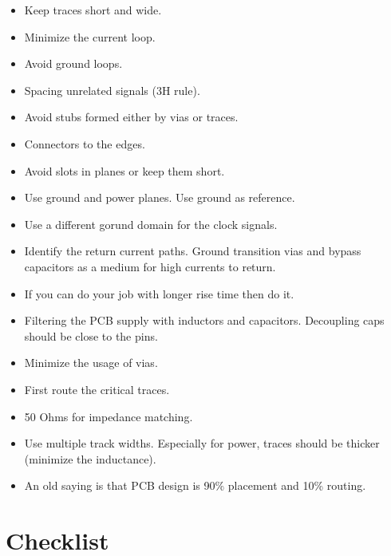 \documentclass[final]{cubedoc}
\begin{document}
	\begin{itemize}
		\item Keep traces short and wide. 
		\item Minimize the current loop.
		\item Avoid ground loops.
		\item Spacing unrelated signals (3H rule).
		\item Avoid stubs formed either by vias or traces.
		\item Connectors to the edges.
		\item Avoid slots in planes or keep them short.
		\item Use ground and power planes. Use ground as reference.
		\item Use a different gorund domain for the clock signals.
		\item Identify the return current paths. Ground transition vias and bypass capacitors as a medium for high currents to return.
		\item If you can do your job with longer rise time then do it.
		\item Filtering the PCB supply with inductors and capacitors. Decoupling caps should be close to the pins.
		\item Minimize the usage of vias.
		\item First route the critical traces.
		\item 50 Ohms for impedance matching.
		\item Use multiple track widths. Especially for power, traces should be thicker (minimize the inductance).
		\item An old saying is that PCB design is 90\% placement and 10\% routing.
	\end{itemize}
	
	\section{Checklist}
	
\end{document}
